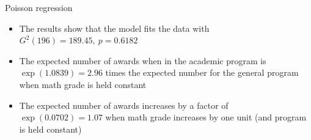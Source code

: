 \documentclass[aspectratio=169]{beamer}
\begin{document}
%
%


\begin{frame}{Poisson regression}
\begin{itemize}
  \item The results show that the model fits the data with $G^2(196) =
    189.45,~p=0.6182$
  \item The expected number of awards when in the academic program is
    $\exp(1.0839) = 2.96$ times the expected number for the general program
    when math grade is held constant
  \item The expected number of awards increases by a factor of
    $\exp(0.0702) = 1.07$ when math grade increases by one unit (and
    program is held constant)
\end{itemize}
\end{frame}
\end{document}
